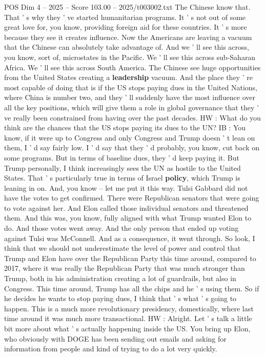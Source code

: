 \begin{textsample}{POS Dim 4 – 2025 – Score 103.00 – 2025/t003002.txt}
The Chinese know that.
That ' s why they ' ve started humanitarian programs.
It ' s not out of some great love for, you know, providing foreign aid for these countries.
It ' s more because they see it creates influence.
Now the Americans are leaving a vacuum that the Chinese can absolutely take advantage of.
And we ' ll see this across, you know, sort of, microstates in the Pacific.
We ' ll see this across sub-Saharan Africa.
We ' ll see this across South America.
The Chinese see huge opportunities from the United States creating a \textbf{leadership} vacuum.
And the place they ' re most capable of doing that is if the US stops paying dues in the United Nations, where China is number two, and they ' ll suddenly have the most influence over all the key positions, which will give them a role in global governance that they ' ve really been constrained from having over the past decades.
HW : What do you think are the chances that the US stops paying its dues to the UN?
IB : You know, if it were up to Congress and only Congress and Trump doesn ' t lean on them, I ' d say fairly low.
I ' d say that they ' d probably, you know, cut back on some programs.
But in terms of baseline dues, they ' d keep paying it.
But Trump personally, I think increasingly sees the UN as hostile to the United States.
That ' s particularly true in terms of Israel \textbf{policy}, which Trump is leaning in on.
And, you know -- let me put it this way.
Tulsi Gabbard did not have the votes to get confirmed.
There were Republican senators that were going to vote against her.
And Elon called those individual senators and threatened them.
And this was, you know, fully aligned with what Trump wanted Elon to do.
And those votes went away.
And the only person that ended up voting against Tulsi was McConnell.
And as a consequence, it went through.
So look, I think that we should not underestimate the level of power and control that Trump and Elon have over the Republican Party this time around, compared to 2017, where it was really the Republican Party that was much stronger than Trump, both in his administration creating a lot of guardrails, but also in Congress.
This time around, Trump has all the chips and he ' s using them.
So if he decides he wants to stop paying dues, I think that ' s what ' s going to happen.
This is a much more revolutionary presidency, domestically, where last time around it was much more transactional.
HW : Alright.
Let ' s talk a little bit more about what ' s actually happening inside the US.
You bring up Elon, who obviously with DOGE has been sending out emails and asking for information from people and kind of trying to do a lot very quickly.

\end{textsample}
